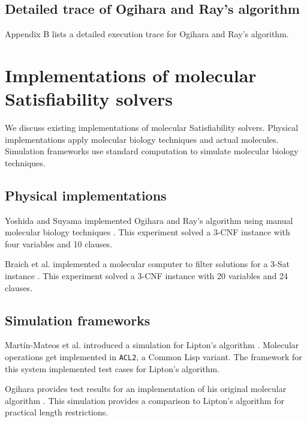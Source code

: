 	\subsection{Detailed trace of Ogihara and Ray's algorithm}
	
Appendix B lists a detailed execution trace for Ogihara and Ray's algorithm.

\section{Implementations of molecular {\sc Satisfiability} solvers}

We discuss existing implementations of molecular {\sc Satisfiability} solvers.  Physical implementations apply molecular biology techniques and actual molecules.  Simulation frameworks use standard computation to simulate molecular biology techniques.

	\subsection{Physical implementations}
	

Yoshida and Suyama implemented Ogihara and Ray's algorithm using manual molecular biology techniques \cite{dnaBasedImplemetation_Yoshida2000}.  This experiment solved a 3-CNF instance with four variables and 10 clauses.

Braich et al. implemented a molecular computer to filter solutions for a 3-{\sc Sat} instance \cite{Braich02solutionof}.  This experiment solved a 3-CNF instance with 20 variables and 24 clauses.
	
	\subsection{Simulation frameworks}

Martín-Mateos et al. introduced a simulation for Lipton's algorithm \cite{MartinMateos02molecularcomputation}.   Molecular operations get implemented in \texttt{ACL2}, a Common Lisp variant.  The framework for this system implemented test cases for Lipton's algorithm.

Ogihara provides test results for an implementation of his original molecular algorithm \cite{Ogihara:1996:BFS:898228}.  This simulation provides a comparison to Lipton's algorithm for practical length restrictions.
